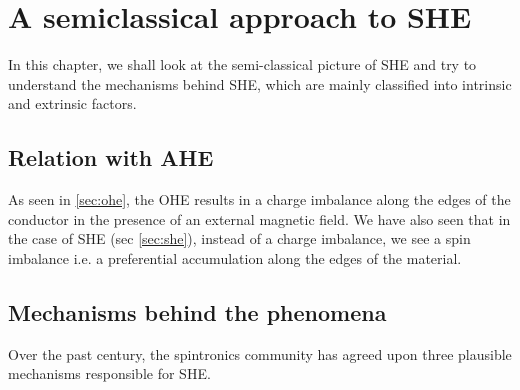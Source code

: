 \chapter{A semiclassical approach to SHE}

\label{chapter3}

In this chapter, we shall look at the semi-classical picture of SHE and try to understand the mechanisms behind SHE, which are mainly classified into intrinsic and extrinsic factors.

\section{Relation with AHE}

As seen in \cref{sec:ohe}, the OHE results in a charge imbalance along the edges of the conductor in the presence of an external magnetic field. We have also seen that in the case of SHE (sec \ref{sec:she}), instead of a charge imbalance, we see a spin imbalance i.e. a preferential accumulation along the edges of the material.




\section{Mechanisms behind the phenomena}

Over the past century, the spintronics community has agreed upon three plausible mechanisms responsible for SHE.
